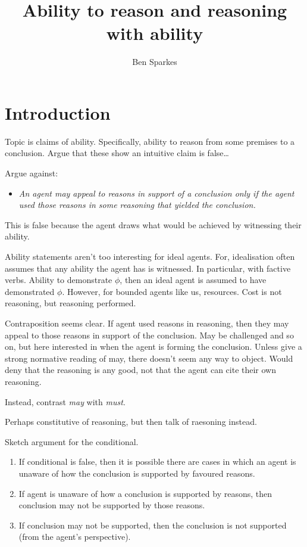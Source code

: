 \documentclass[10pt]{article}
\title{Ability to reason and reasoning with ability}
\author{Ben Sparkes}
\begin{document}


\maketitle

\section{Introduction}
\label{sec:introduction}

{
  \color{red}
  Topic is claims of ability.
  Specifically, ability to reason from some premises to a conclusion.
  Argue that these show an intuitive claim is false\dots
}

Argue against:
\begin{itemize}
\item\label{denied-claim} \emph{An agent may appeal to reasons in support of a conclusion only if the agent used those reasons in some reasoning that yielded the conclusion.}
\end{itemize}

{
  \color{red}
  This is false because the agent draws what would be achieved by witnessing their ability.
}

{
  \color{red}
  Ability statements aren't too interesting for ideal agents.
  For, idealisation often assumes that any ability the agent has is witnessed.
  In particular, with factive verbs.
  Ability to demonstrate \(\phi\), then an ideal agent is assumed to have demonstrated \(\phi\).
  However, for bounded agents like us, resources.
  Cost is not reasoning, but reasoning performed.
}

Contraposition seems clear.
If agent used reasons in reasoning, then they may appeal to those reasons in support of the conclusion.
May be challenged and so on, but here interested in when the agent is forming the conclusion.
Unless give a strong normative reading of may, there doesn't seem any way to object.
Would deny that the reasoning is any good, not that the agent can cite their own reasoning.

Instead, contrast \emph{may} with \emph{must}.

Perhaps constitutive of reasoning, but then talk of raesoning instead.

Sketch argument for the conditional.

\begin{enumerate}
\item\label{opp:sketch:1} If conditional is false, then it is possible there are cases in which an agent is unaware of how the conclusion is supported by favoured reasons.
\item\label{opp:sketch:2} If agent is unaware of how a conclusion is supported by reasons, then conclusion may not be supported by those reasons.
\item\label{opp:sketch:3} If conclusion may not be supported, then the conclusion is not supported (from the agent's perspective).
\end{enumerate}
\end{document}
